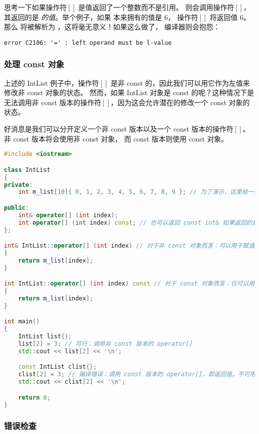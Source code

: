 \documentclass[../../LearnCpp.tex]{subfiles}
\begin{document}
思考一下如果操作符$\left[\right]$ 是值返回了一个整数而不是引用。 则会调用操作符$\left[\right]$，
其返回的是  \textit{的值}。举个例子，如果  本来拥有的值是 6，
操作符$\left[\right]$ 将返回值 6。那么  将被解析为 ，这将毫无意义！如果这么做了，
编译器则会抱怨：

\begin{lstlisting}
error C2106: '=' : left operand must be l-value
\end{lstlisting}

\subsubsection*{处理 const 对象}

上述的 IntList 例子中，操作符$\left[\right]$ 是非 const 的，因此我们可以用它作为左值来修改非 const 对象的状态。
然而，如果 IntList 对象是 const 的呢？这种情况下是无法调用非 const 版本的操作符$\left[\right]$，因为这会允许潜在的修改一个 const 对象的状态。

好消息是我们可以分开定义一个非 const 版本以及一个 const 版本的操作符$\left[\right]$。非 const 版本将会使用非 const 对象，
而 const 版本则使用 const 对象。

\begin{lstlisting}[language=C++]
#include <iostream>

class IntList
{
private:
    int m_list[10]{ 0, 1, 2, 3, 4, 5, 6, 7, 8, 9 }; // 为了演示，这里给一些初始值

public:
    int& operator[] (int index);
    int operator[] (int index) const; // 也可以返回 const int& 如果返回的是一个非基础类型
};

int& IntList::operator[] (int index) // 对于非 const 对象而言：可以用于赋值
{
    return m_list[index];
}

int IntList::operator[] (int index) const // 对于 const 对象而言：仅可以用于访问
{
    return m_list[index];
}

int main()
{
    IntList list{};
    list[2] = 3; // 可行：调用非 const 版本的 operator[]
    std::cout << list[2] << '\n';

    const IntList clist{};
    clist[2] = 3; // 编译错误：调用 const 版本的 operator[]，即返回值。不可用于赋值，因为其为右值。
    std::cout << clist[2] << '\n';

    return 0;
}
\end{lstlisting}

\subsubsection*{错误检查}
\end{document}

